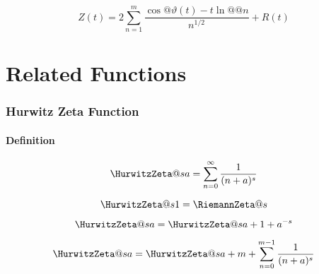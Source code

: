 \documentclass{article}
\begin{document}

\begin{equation}\label{eq:ZE.ZERO.RS1}
  Z(t)
  = 2 \sum_{n=1}^m \frac{\cos@{\vartheta(t) - t \ln@@{n}}}{n^{1/2}}
  + R(t)
\end{equation}

\part{Related Functions}\label{pt:ZE.MPRF}

\section{Hurwitz Zeta Function}\label{sec:ZE.HZE}%


\subsection{Definition}\label{sec:ZE.HZE.RX}


\begin{equation}\label{eq:ZE.HZE.RX1} %
  \HurwitzZeta@{s}{a} = \sum_{n=0}^\infty \frac{1}{(n+a)^s}
\end{equation}

 
\begin{equation}\label{eq:ZE.HZE.RX1A}%
  \HurwitzZeta@{s}{1} = \RiemannZeta@{s}
\end{equation}

\begin{equation}\label{eq:ZE.HZE.RX2}
  \HurwitzZeta@{s}{a} = \HurwitzZeta@{s}{a+1} + a^{-s}
\end{equation}

\begin{equation}\label{eq:ZE.HZE.RX3}
  \HurwitzZeta@{s}{a}
  = \HurwitzZeta@{s}{a+m} + \sum_{n=0}^{m-1} \frac{1}{(n+a)^s}
\end{equation}
\end{document}
